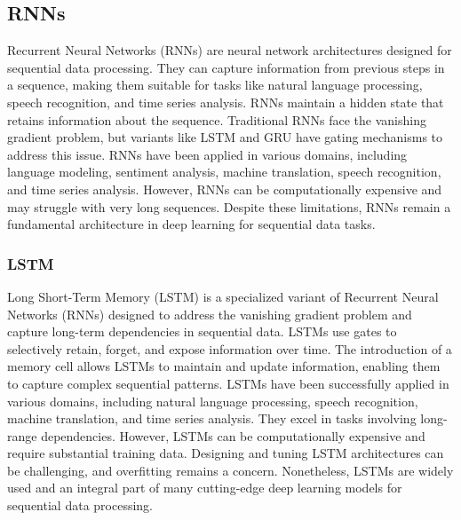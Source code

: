 \subsection{RNNs}
Recurrent Neural Networks (RNNs) are neural network architectures designed for sequential data processing. They can capture information from previous steps in a sequence, making them suitable for tasks like natural language processing, speech recognition, and time series analysis. RNNs maintain a hidden state that retains information about the sequence. Traditional RNNs face the vanishing gradient problem, but variants like LSTM and GRU have gating mechanisms to address this issue. RNNs have been applied in various domains, including language modeling, sentiment analysis, machine translation, speech recognition, and time series analysis. However, RNNs can be computationally expensive and may struggle with very long sequences. Despite these limitations, RNNs remain a fundamental architecture in deep learning for sequential data tasks.
\subsubsection{LSTM}
Long Short-Term Memory (LSTM) is a specialized variant of Recurrent Neural Networks (RNNs) designed to address the vanishing gradient problem and capture long-term dependencies in sequential data. LSTMs use gates to selectively retain, forget, and expose information over time. The introduction of a memory cell allows LSTMs to maintain and update information, enabling them to capture complex sequential patterns. LSTMs have been successfully applied in various domains, including natural language processing, speech recognition, machine translation, and time series analysis. They excel in tasks involving long-range dependencies. However, LSTMs can be computationally expensive and require substantial training data. Designing and tuning LSTM architectures can be challenging, and overfitting remains a concern. Nonetheless, LSTMs are widely used and an integral part of many cutting-edge deep learning models for sequential data processing.
